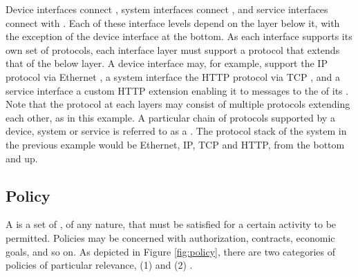 Device interfaces connect , system interfaces connect , and service interfaces connect  with .
Each of these interface levels depend on the layer below it, with the exception of the device interface at the bottom.
As each interface supports its own set of protocols, each interface layer must support a protocol that extends that of the below layer.
A device interface may, for example, support the IP \cite{deering2017internet} protocol via Ethernet \cite{iso202188023}, a system interface the HTTP \cite{fielding2014hypertext} protocol via TCP \cite{postel1981transmission}, and a service interface a custom HTTP extension enabling it to  messages to the  of its .
Note that the protocol at each layers may consist of multiple protocols extending each other, as in this example.
A particular chain of protocols supported by a device, system or service is referred to as a .
The protocol stack of the system in the previous example would be Ethernet, IP, TCP and HTTP, from the bottom and up.

\newpage

\subsection{Policy}
\label{sec:reference-model:policy}

A  is a set of , of any nature, that must be satisfied for a certain activity to be permitted.
Policies may be concerned with authorization, contracts, economic goals, and so on.
As depicted in Figure \ref{fig:policy}, there are two categories of policies of particular relevance, (1)  and (2) .

